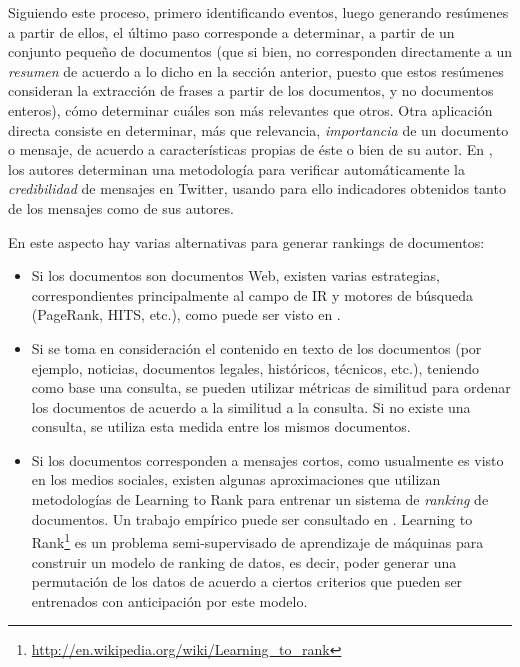    Siguiendo este proceso, primero identificando eventos, luego
   generando resúmenes a partir de ellos, el último paso corresponde a
   determinar, a partir de un conjunto pequeño de documentos (que si
   bien, no corresponden directamente a un \emph{resumen} de acuerdo a lo
   dicho en la sección anterior, puesto que estos resúmenes consideran
   la extracción de frases a partir de los documentos, y no documentos
   enteros), cómo determinar cuáles son más relevantes que otros. Otra
   aplicación directa consiste en determinar, más que relevancia,
   \emph{importancia} de un documento o mensaje, de acuerdo a
   características propias de éste o bien de su autor. En
   \cite{Castillo:2011:ICT:1963405.1963500}, los autores determinan
   una metodología para verificar automáticamente la \emph{credibilidad} de
   mensajes en Twitter, usando para ello indicadores obtenidos tanto
   de los mensajes como de sus autores.

   En este aspecto hay varias alternativas para generar rankings de
   documentos:

\begin{itemize}
\item Si los documentos son documentos Web, existen
     varias estrategias, correspondientes principalmente al campo de
     IR y motores de búsqueda (PageRank, HITS, etc.), como puede ser
     visto en \cite{signorini2005survey}.
\item Si se toma en consideración el contenido en texto de los
     documentos (por ejemplo, noticias, documentos legales,
     históricos, técnicos, etc.), teniendo como base una consulta, se
     pueden utilizar métricas de similitud para ordenar los documentos
     de acuerdo a la similitud a la consulta. Si no existe una
     consulta, se utiliza esta medida entre los mismos documentos.
\item Si los documentos corresponden a mensajes cortos, como usualmente
     es visto en los medios sociales, existen algunas aproximaciones
     que utilizan metodologías de Learning to Rank para entrenar un
     sistema de \emph{ranking} de documentos. Un trabajo empírico puede ser
     consultado en \cite{Duan:2010:ESL:1873781.1873815}. Learning to
     Rank\footnote{\href{http://en.wikipedia.org/wiki/Learning\_to\_rank}{http://en.wikipedia.org/wiki/Learning\_to\_rank} }
     es un problema semi-supervisado de aprendizaje de
     máquinas para construir un modelo de ranking de datos, es decir,
     poder generar una permutación de los datos de acuerdo a ciertos
     criterios que pueden ser entrenados con anticipación por este
     modelo.
\end{itemize}
